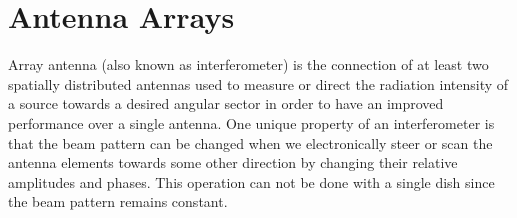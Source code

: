  
  \section{Antenna Arrays}	   \label{chap2:sec4}
  Array antenna (also known as interferometer) is the connection of at least two spatially distributed  antennas used to measure or direct the radiation intensity of a source 
  towards a desired angular sector in order to have an improved performance over a single antenna. One unique property of an interferometer is that the beam pattern can be changed when we 
  electronically steer or scan the antenna elements towards some other direction by changing their relative amplitudes and phases. 
  This operation can not be done with a single dish since the beam pattern remains constant. 


%
